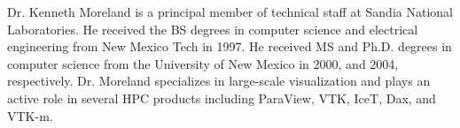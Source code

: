 \documentclass[letterpaper,twocolumn,fleqn]{article}
\begin{document}

\small



\begin{biography}
\noindent
Dr. Kenneth Moreland is a principal member of technical staff at Sandia
National Laboratories. He received the BS degrees in computer science and
electrical engineering from New Mexico Tech in 1997. He received MS and
Ph.D. degrees in computer science from the University of New Mexico in
2000, and 2004, respectively. Dr. Moreland specializes in large-scale
visualization and plays an active role in several HPC products including
ParaView, VTK, IceT, Dax, and VTK-m.
\end{biography}
\end{document}

